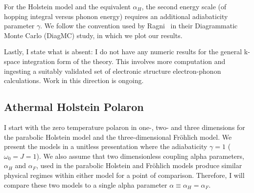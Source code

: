 For the Holstein model and the equivalent $\alpha_H$, the second energy scale (of hopping integral versus phonon energy) requires an additional adiabaticity parameter $\gamma$. We follow the convention used by Ragni~\cite{ragni_diagrammatic_2020} in their Diagrammatic Monte Carlo (DiagMC) study, in which we plot our results. 


Lastly, I state what is absent: I do not have any numeric results for the general k-space integration form of the theory. This involves more computation and ingesting a suitably validated set of electronic structure electron-phonon calculations. Work in this direction is ongoing.

\subsection{Athermal Holstein Polaron}

I start with the zero temperature polaron in one-, two- and three dimensions for the parabolic Holstein model and the three-dimensional Fr\"ohlich model. We present the models in a unitless presentation where the adiabaticity $\gamma = 1$ ($\omega_0 = J = 1$). We also assume that two dimensionless coupling alpha parameters, $\alpha_H$ and $\alpha_F$, used in the parabolic Holstein and Fr\"ohlich models produce similar physical regimes within either model for a point of comparison. Therefore, I will compare these two models to a single alpha parameter $\alpha \equiv \alpha_H = \alpha_F$.

